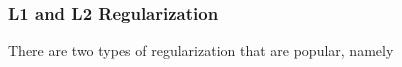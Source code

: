\subsubsection{L1 and L2 Regularization}

There are two types of regularization that are popular, namely 